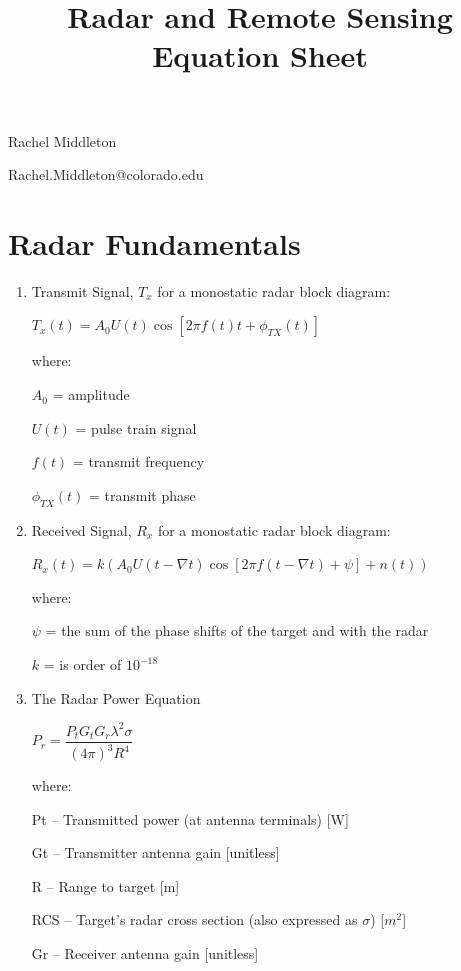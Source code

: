 \documentclass[10pt]{article}
\title{Radar and Remote Sensing Equation Sheet}
\date{}
\renewcommand{\frac}{\dfrac}
\begin{document}
\maketitle

\centerline{Rachel Middleton} 

\centerline{Rachel.Middleton@colorado.edu}


\section*{Radar Fundamentals}


\begin{enumerate}

\item Transmit Signal, $T_x$ for a monostatic radar block diagram: \\
  
  
	\centerline{{$T_x (t) = A_0U(t)\cos[2\pi f(t)t +\phi_{TX}(t)]$}}
 
	where:

	$A_0$ = amplitude

	$U(t)$ = pulse train signal

	$f(t)$ = transmit frequency

	$\phi _{TX}(t)$ = transmit phase
  
  
\item Received Signal, $R_x$ for a monostatic radar block diagram: \\
  
  
	\centerline{$R_x (t) =k(A_0 U(t-\nabla t)\cos[2\pi f(t-\nabla t) + \psi] +n(t))$}
	
	where:

	$\psi$ = the sum of the phase shifts of the target and with the radar

	$k$ = is order of $10^{-18}$
  
  
\item The Radar Power Equation

	\centerline{$P_r = \frac{P_t G_t G_r {\lambda}^2 \sigma}{(4\pi)^3 R^4}$}
	
	where:
	
	Pt – Transmitted power (at antenna terminals) [W]

	Gt – Transmitter antenna gain [unitless]

	R – Range to target [m]
	
	RCS – Target’s radar cross section (also expressed as $\sigma$) [$m^2$]
	
	Gr – Receiver antenna gain  [unitless]
	

\end{enumerate}
\end{document}
